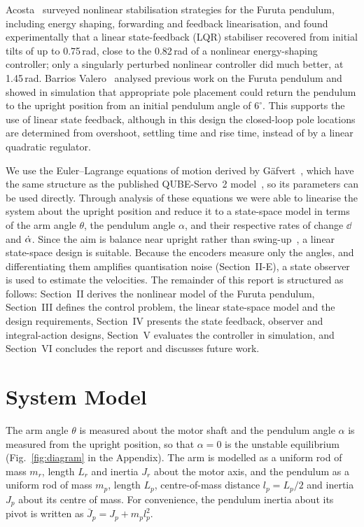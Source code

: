 Acosta~\cite{acosta2010} surveyed nonlinear stabilisation strategies for the Furuta pendulum, including energy shaping, forwarding and feedback linearisation, and found experimentally that a linear state-feedback (LQR) stabiliser recovered from initial tilts of up to 0.75\,rad, close to the 0.82\,rad of a nonlinear energy-shaping controller; only a singularly perturbed nonlinear controller did much better, at 1.45\,rad. Barrios Valero~\cite{barrios2016} analysed previous work on the Furuta pendulum and showed in simulation that appropriate pole placement could return the pendulum to the upright position from an initial pendulum angle of $6^\circ$. This supports the use of linear state feedback, although in this design the closed-loop pole locations are determined from overshoot, settling time and rise time, instead of by a linear quadratic regulator.

We use the Euler--Lagrange equations of motion derived by G\"afvert~\cite{gafvert1998}, which have the same structure as the published QUBE-Servo~2 model~\cite{xu2023}, so its parameters can be used directly. Through analysis of these equations we were able to linearise the system about the upright position and reduce it to a state-space model in terms of the arm angle $\theta$, the pendulum angle $\alpha$, and their respective rates of change $\dd$ and $\dot\alpha$. Since the aim is balance near upright rather than swing-up~\cite{astrom1996}, a linear state-space design is suitable. Because the encoders measure only the angles, and differentiating them amplifies quantisation noise (Section~II-E), a state observer is used to estimate the velocities. The remainder of this report is structured as follows: Section~II derives the nonlinear model of the Furuta pendulum, Section~III defines the control problem, the linear state-space model and the design requirements, Section~IV presents the state feedback, observer and integral-action designs, Section~V evaluates the controller in simulation, and Section~VI concludes the report and discusses future work.

\section{System Model}
The arm angle $\theta$ is measured about the motor shaft and the pendulum angle $\alpha$ is measured from the upright position, so that $\alpha=0$ is the unstable equilibrium (Fig.~\ref{fig:diagram} in the Appendix). The arm is modelled as a uniform rod of mass $m_r$, length $L_r$ and inertia $J_r$ about the motor axis, and the pendulum as a uniform rod of mass $m_p$, length $L_p$, centre-of-mass distance $l_p=L_p/2$ and inertia $J_p$ about its centre of mass. For convenience, the pendulum inertia about its pivot is written as $\bar J_p=J_p+m_pl_p^2$.

